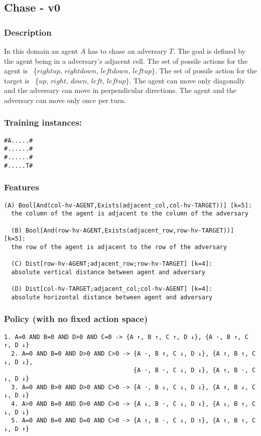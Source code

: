 \documentclass[a4paper]{article}
\begin{document}
\subsection{Chase - v0}
\subsubsection{Description}
In this domain an agent $A$ has to chase an adversary $T$. The goal is defined by the agent being in a adversary's adjacent cell. The set of possile actions for the agent is ~\{$rightup$, $rightdown$, $leftdown$, $leftup\}$.
The set of possile action for the target is ~\{$up$, $right$, $down$, $left$, $leftup\}$. The agent can move only diagonally and the adversary can move in perpendicular directions.  The agent and the adversary can move only once per turn.

\subsubsection{Training instances:}
\begin{Verbatim}[fontsize=\footnotesize]
#A.....#
#......#
#......#
#.....T#
\end{Verbatim}

\subsubsection{Features}
\begin{Verbatim}[fontsize=\footnotesize]
  (A) Bool[And(col-hv-AGENT,Exists(adjacent_col,col-hv-TARGET))] [k=5]:
  the column of the agent is adjacent to the column of the adversary

  (B) Bool[And(row-hv-AGENT,Exists(adjacent_row,row-hv-TARGET))] [k=5]:
  the row of the agent is adjacent to the row of the adversary

  (C) Dist[row-hv-AGENT;adjacent_row;row-hv-TARGET] [k=4]:
  absolute vertical distance between agent and adversary

  (D) Dist[col-hv-TARGET;adjacent_col;col-hv-AGENT] [k=4]:
  absolute horizontal distance between agent and adversary
\end{Verbatim}

\subsubsection{Policy (with no fixed action space)}

\begin{Verbatim}[fontsize=\footnotesize]
  1. A=0 AND B=0 AND D>0 AND C=0 -> {A ↑, B ↑, C ↑, D ↓}, {A ·, B ↑, C ↑, D ↓}
  2. A=0 AND B=0 AND D>0 AND C>0 -> {A ·, B ↑, C ↓, D ↓}, {A ↑, B ↑, C ↓, D ↓},
                                    {A ·, B ·, C ↓, D ↓}, {A ↑, B ·, C ↓, D ↓}
  3. A=0 AND B>0 AND D>0 AND C>0 -> {A ·, B ↓, C ↓, D ↓}, {A ↑, B ↓, C ↓, D ↓}
  4. A>0 AND B=0 AND D>0 AND C>0 -> {A ↓, B ·, C ↓, D ↓}, {A ↓, B ↑, C ↓, D ↓}
  5. A=0 AND B=0 AND D=0 AND C>0 -> {A ↑, B ·, C ↓, D ↑}, {A ↑, B ↑, C ↓, D ↑}


\end{Verbatim}
\end{document}
